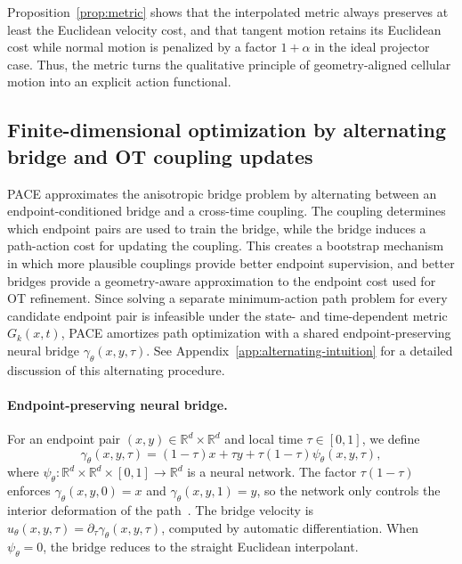         Proposition~\ref{prop:metric} shows that the interpolated metric always preserves at least the Euclidean velocity cost, and that tangent motion retains its Euclidean cost while normal motion is penalized by a factor \(1+\alpha\) in the ideal projector case.
        Thus, the metric turns the qualitative principle of geometry-aligned cellular motion into an explicit action functional.

    \subsection{Finite-dimensional optimization by alternating bridge and OT coupling updates}
    \label{sec:alternating}

    PACE approximates the anisotropic bridge problem by alternating between an endpoint-conditioned bridge and a cross-time coupling. The coupling determines which endpoint pairs are used to train the bridge, while the bridge induces a path-action cost for updating the coupling. This creates a bootstrap mechanism in which more plausible couplings provide better endpoint supervision, and better bridges provide a geometry-aware approximation to the endpoint cost used for OT refinement. Since solving a separate minimum-action path problem for every candidate endpoint pair is infeasible under the state- and time-dependent metric $G_k(x,t)$, PACE amortizes path optimization with a shared endpoint-preserving neural bridge $\gamma_\theta(x,y,\tau)$. See Appendix~\ref{app:alternating-intuition} for a detailed discussion of this alternating procedure.

    \paragraph{Endpoint-preserving neural bridge.}
    For an endpoint pair \((x,y)\in\mathbb{R}^d\times\mathbb{R}^d\) and local time \(\tau\in[0,1]\), we define
    \begin{equation}
    \label{eq:bridge}
    \gamma_\theta(x,y,\tau)
    =
    (1-\tau)x+\tau y
    +
    \tau(1-\tau)\psi_\theta(x,y,\tau),
    \end{equation}
    where \(\psi_\theta:\mathbb{R}^d\times\mathbb{R}^d\times[0,1]\to\mathbb{R}^d\) is a neural network. The factor \(\tau(1-\tau)\) enforces \(\gamma_\theta(x,y,0)=x\) and \(\gamma_\theta(x,y,1)=y\), so the network only controls the interior deformation of the path~\citep{petrovic2026curly}. The bridge velocity is \(u_\theta(x,y,\tau)=\partial_\tau\gamma_\theta(x,y,\tau)\), computed by automatic differentiation. When \(\psi_\theta=0\), the bridge reduces to the straight Euclidean interpolant.


